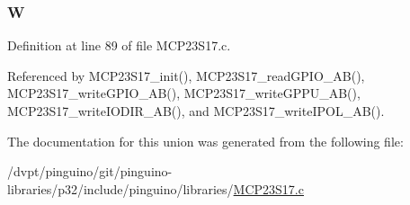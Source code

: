 \hypertarget{uniontag_m_c_p23_s17_u_a46abd0e479371c5e886b9236e98ce322}{
\subsubsection[{W}]{ W}}\label{uniontag_m_c_p23_s17_u_a46abd0e479371c5e886b9236e98ce322}


Definition at line 89 of file M\-C\-P23\-S17.\-c.



Referenced by M\-C\-P23\-S17\-\_\-init(), M\-C\-P23\-S17\-\_\-read\-G\-P\-I\-O\-\_\-\-A\-B(), M\-C\-P23\-S17\-\_\-write\-G\-P\-I\-O\-\_\-\-A\-B(), M\-C\-P23\-S17\-\_\-write\-G\-P\-P\-U\-\_\-\-A\-B(), M\-C\-P23\-S17\-\_\-write\-I\-O\-D\-I\-R\-\_\-\-A\-B(), and M\-C\-P23\-S17\-\_\-write\-I\-P\-O\-L\-\_\-\-A\-B().



The documentation for this union was generated from the following file\-:\begin{DoxyCompactItemize}
\item 
/dvpt/pinguino/git/pinguino-\/libraries/p32/include/pinguino/libraries/\hyperlink{_m_c_p23_s17_8c}{M\-C\-P23\-S17.\-c}\end{DoxyCompactItemize}
